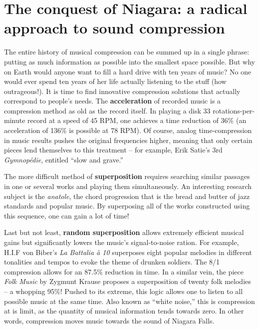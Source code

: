 \documentclass{article}
\begin{document}
\section*{The conquest of Niagara: a radical approach to sound compression}
The entire history of musical compression can be summed up in a single
phrase: putting as much information as possible into the smallest space
possible.  But why on Earth would anyone want to fill a hard drive with ten
years of music?  No one would ever spend ten years of her life actually
listening to the stuff (how outrageous!).  It is time to find innovative
compression solutions that actually correspond to people's needs.
The \textbf{acceleration} of recorded music is a compression method as old
as the record itself.  In playing a disk 33 rotations-per-minute record
at a speed of 45 RPM, one achieves a time reduction of 36\% (an acceleration
of 136\% is possible at 78 RPM).  Of course, analog time-compression in
music results pushes the original frequencies higher, meaning that only
certain pieces lend themselves to this treatment -- for example, Erik
Satie's 3rd \emph{Gymnop\'edie}, entitled ``slow and grave.''

The more difficult method of \textbf{superposition} requires searching
similar passages in one or several works and playing them simultaneously. 
An interesting research subject is the \emph{anatole}, the chord progression
that is the bread and butter of jazz standards and popular music.  By
superposing all of the works constructed using this sequence, one can gain a
lot of time!

Last but not least, \textbf{random superposition} allows extremely efficient
musical gains but significantly lowers the music's signal-to-noise ration.
For example, H.I.F von Biber's \emph{La Battalia à 10} superposes eight
popular melodies in different tonalities and tempos to evoke the theme of
drunken soldiers.  The 8/1 compression allows for an 87.5\% reduction in
time.  In a similar vein, the piece \emph{Folk Music} by Zygmunt Krause
proposes a superposition of twenty folk melodies -- a whopping 95\%! Pushed
to its extreme, this logic allows one to listen to all possible music at the
same time.  Also known as ``white noise,'' this is compression at is limit,
as the quantity of musical information tends towards zero.  In other words,
compression moves music towards the sound of Niagara Falls.
\end{document}
